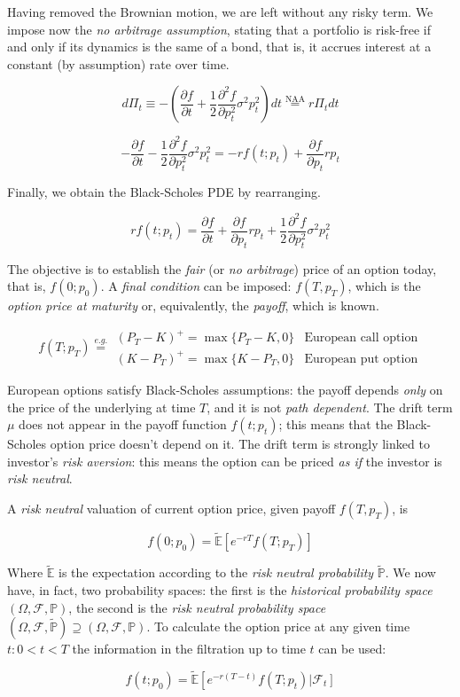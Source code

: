 \documentclass[oneside,titlepage,headinclude,12pt,a4paper,BCOR5mm,footinclude]{book}
\theoremstyle{defn}
\newcommand{\de}{\partial}
\begin{document}
  Having removed  the Brownian motion,  we are left  without any risky  term. We
  impose now the  \textit{no arbitrage assumption}, stating that  a portfolio is
  risk-free if  and only  if its dynamics  is the  same of a  bond, that  is, it
  accrues interest at a constant (by assumption) rate over time.

  \[
    d\Pi_t \equiv - \left( \frac{\partial f}{\partial t} + 
      \frac{1}{2}\frac{\partial^2 f}{\partial p_t^2} \sigma^2 p_t^2 \right) dt 
      \stackrel{\text{NAA}}{=} r\Pi_t dt
  \]

  \[
    -\frac{\de f}{\de t} -\frac{1}{2}\frac{\de^2f}{\de p_t^2} \sigma^2 p_t^2 =
    -rf(t;p_t) + \frac{\de f}{\de p_t} rp_t
  \]

  Finally, we obtain the Black-Scholes PDE by rearranging.

  \[
    rf(t;p_t) = \frac{\de f}{\de t} + \frac{\de f}{\de p_t} rp_t + \frac{1}{2}\frac{\de^2 f}{\de p_t^2} \sigma^2 p_t^2
  \]

  The objective  is to  establish the  \textit{fair} (or  \textit{no arbitrage})
  price of an option today, that  is, $f(0;p_0)$. A \textit{final condition} can
  be imposed:  $f(T,p_T)$, which  is the \textit{option  price at  maturity} or,
  equivalently, the \textit{payoff}, which is known.

  \[
    f(T;p_T) \stackrel{e.g.}{=}
    \begin{array}{ll}
      (P_T - K)^+ = \max \{ P_T - K, 0 \} & \text{European call option} \\
      (K - P_T)^+ = \max \{ K - P_T, 0 \} & \text{European put option}
    \end{array}
  \]

  European  options  satisfy  Black-Scholes   assumptions:  the  payoff  depends
  \textit{only}  on the  price of  the underlying  at time  $T$, and  it is  not
  \textit{path dependent}.  The drift term $\mu$  does not appear in  the payoff
  function $f(t;p_t)$;  this means that  the Black-Scholes option  price doesn't
  depend on  it. The drift  term is  strongly linked to  investor's \textit{risk
  aversion}: this means the option can  be priced \textit{as if} the investor is
  \textit{risk neutral}.

  A \textit{risk neutral} valuation of current option price, given payoff $f(T,p_T)$, is

  \[
    f(0;p_0) = \tilde{\mathbb{E}} \left[ e^{-rT} f(T;p_T)\right]
  \]

  Where $\tilde{\mathbb{E}}$  is the  expectation according to  the \textit{risk
  neutral  probability}   $\tilde{\mathbb{P}}$.  We  now  have,   in  fact,  two
  probability  spaces: the  first is  the \textit{historical  probability space}
  $(\Omega,\mathcal{F},\mathbb{P})$,  the  second  is the  \textit{risk  neutral
  probability  space}   $(\Omega,  \mathcal{F},   \tilde{\mathbb{P}})  \supseteq
  (\Omega,\mathcal{F},\mathbb{P})$. To  calculate the option price  at any given
  time $t : 0 <  t < T$ the information in the filtration up  to time $t$ can be
  used:

  \[
    f(t;p_0) = \tilde{\mathbb{E}} \left[ e^{-r(T-t)} f(T;p_t) \left| \mathcal{F}_t\right]
  \]
\end{document}
